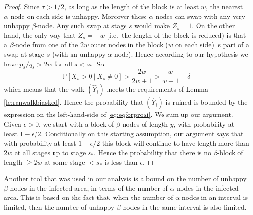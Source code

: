 \documentclass[11pt]{article}
\theoremstyle{plain}
\numberwithin{equation}{subsection}
\DeclareRobustCommand{\probac}[3][{\mbox{$\mathbb{P}$}}]{\ensuremath {#1}[ {#2} \ |\  {#3} ]}
\begin{document}
\begin{proof}
Since $\tau>1/2$, as long as the length of the block is at least $w$, the nearest
$\alpha$-node on each side is unhappy.
Moreover these $\alpha$-nodes can swap with any very unhappy $\beta$-node. 
Any such swap at stage $s$ would make $Z_s= 1$.
On the other hand,
the only way that $Z_s=-w$ (i.e.\ the length of the block is reduced)
is that a $\beta$-node from one of the $2w$ outer nodes in the block ($w$ on each side)
is part of a swap at stage $s$ (with an unhappy $\alpha$-node).
Hence according to our hypothesis we have $p_s/q_s>2w$ for all $s<s_{\ast}$. So
\[
\probac{X_s>0}{X_s\neq 0}>\frac{2w}{2w+1}> \frac{w}{w+1}+\delta
\]
which means that the walk $(\hat{Y}_i)$ meets the requirements of Lemma
\ref{le:ranwalkbiasked}. Hence the probability that
$(\hat{Y}_i)$ is ruined is bounded by the expression
on the left-hand-side of \eqref{eq:eqforproai}.
We sum up our argument. Given $\epsilon>0$, 
we start with a block of $\beta$-nodes of length $y$, with probability at least $1-\epsilon/2$.
Conditionally on this starting assumption, 
our argument says that with probability at least $1-\epsilon/2$ this block will continue to have
length more than $2w$ at all stages up to stage $s_{\ast}$. Hence the probability that
there is no $\beta$-block of length $\geq 2w$ at some stage $<s_{\ast}$ is less than $\epsilon$.
\end{proof}

Another tool that was used in our analysis is a bound on the number of unhappy $\beta$-nodes
in the infected area, in terms of the number of $\alpha$-nodes in the infected area.
This is based on the fact that, when the number of $\alpha$-nodes 
in an interval is limited, then the number of unhappy $\beta$-nodes in the
same interval is also limited. 
\end{document}
